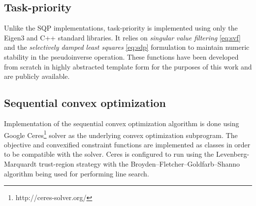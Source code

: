 \documentclass[times, utf8, diplomski, english]{fer}
\begin{document}
\subsection{Task-priority}
Unlike the SQP implementations, task-priority is implemented using only the Eigen3 and C++ standard libraries.
It relies on \textit{singular value filtering} \eqref{eq:svf} and the \textit{selectively damped least squares} \eqref{eq:sdp} formulation to maintain numeric stability in the pseudoinverse operation.
These functions have been developed from scratch in highly abstracted template form for the purposes of this work and are publicly available.

\subsection{Sequential convex optimization}
Implementation of the sequential convex optimization algorithm is done using Google Ceres\footnote{http://ceres-solver.org/} solver as the underlying convex optimization subprogram.
The objective and convexified constraint functions are implemented as classes in order to be compatible with the solver.
Ceres is configured to run using the Levenberg-Marquardt trust-region strategy with the Broyden–Fletcher–Goldfarb–Shanno algorithm being used for performing line search.
\end{document}
